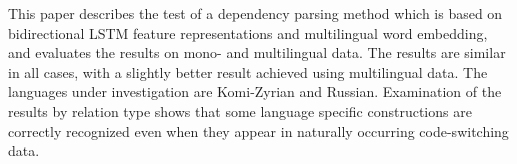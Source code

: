 This paper describes the test of a dependency parsing method which is based on bidirectional LSTM feature representations and multilingual word embedding, and evaluates the results on mono- and multilingual data. The results are similar in all cases, with a slightly better result achieved using multilingual data. The languages under investigation are Komi-Zyrian and Russian. Examination of the results by relation type shows that some language specific constructions are correctly recognized even when they appear in naturally occurring code-switching data.
